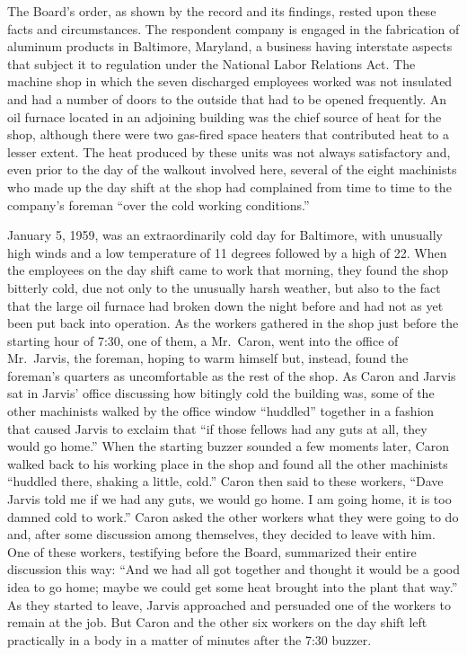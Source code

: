 \documentclass[
  letterpaper,
  11pt,
  DIV=9,
  openright]{scrbook}
\begin{document}
The Board's order, as shown by the record and its findings, rested upon
these facts and circumstances. The respondent company is engaged in the
fabrication of aluminum products in Baltimore, Maryland, a business
having interstate aspects that subject it to regulation under the
National Labor Relations Act. The machine shop in which the seven
discharged employees worked was not insulated and had a number of doors
to the outside that had to be opened frequently. An oil furnace located
in an adjoining building was the chief source of heat for the shop,
although there were two gas-fired space heaters that contributed heat to
a lesser extent. The heat produced by these units was not always
satisfactory and, even prior to the day of the walkout involved here,
several of the eight machinists who made up the day shift at the shop
had complained from time to time to the company's foreman ``over the
cold working conditions.''

January 5, 1959, was an extraordinarily cold day for Baltimore, with
unusually high winds and a low temperature of 11 degrees followed by a
high of 22. When the employees on the day shift came to work that
morning, they found the shop bitterly cold, due not only to the
unusually harsh weather, but also to the fact that the large oil furnace
had broken down the night before and had not as yet been put back into
operation. As the workers gathered in the shop just before the starting
hour of 7:30, one of them, a Mr.~Caron, went into the office of
Mr.~Jarvis, the foreman, hoping to warm himself but, instead, found the
foreman's quarters as uncomfortable as the rest of the shop. As Caron
and Jarvis sat in Jarvis' office discussing how bitingly cold the
building was, some of the other machinists walked by the office window
``huddled'' together in a fashion that caused Jarvis to exclaim that
``if those fellows had any guts at all, they would go home.'' When the
starting buzzer sounded a few moments later, Caron walked back to his
working place in the shop and found all the other machinists ``huddled
there, shaking a little, cold.'' Caron then said to these workers,
``Dave Jarvis told me if we had any guts, we would go home. I am going
home, it is too damned cold to work.'' Caron asked the other workers
what they were going to do and, after some discussion among themselves,
they decided to leave with him. One of these workers, testifying before
the Board, summarized their entire discussion this way: ``And we had all
got together and thought it would be a good idea to go home; maybe we
could get some heat brought into the plant that way.'' As they started
to leave, Jarvis approached and persuaded one of the workers to remain
at the job. But Caron and the other six workers on the day shift left
practically in a body in a matter of minutes after the 7:30 buzzer.
\end{document}
